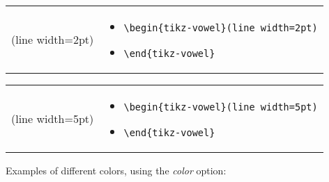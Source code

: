 \documentclass{article}
\begin{document}
\begin{center}
\begin{tabular}{rl}
  \begin{minipage}[t]{0.45\textwidth}
  \centering
	\begin{tikz-vowel}(line width=2pt)
	\end{tikz-vowel}
  \end{minipage} &
  \begin{minipage}[t]{0.2\textwidth}
  \vspace{-65pt}
  {\small
\begin{itemize}[label={}]
	\item \verb|\begin{tikz-vowel}(line width=2pt)|
	\item \verb|\end{tikz-vowel}|
\end{itemize}
    }
  \end{minipage}\\
\end{tabular}
\end{center}

\begin{center}
\begin{tabular}{rl}
  \begin{minipage}[t]{0.45\textwidth}
  \centering
	\begin{tikz-vowel}(line width=5pt)
	\end{tikz-vowel}
  \end{minipage} &
  \begin{minipage}[t]{0.2\textwidth}
  \vspace{-65pt}
  {\small
\begin{itemize}[label={}]
	\item \verb|\begin{tikz-vowel}(line width=5pt)|
	\item \verb|\end{tikz-vowel}|
\end{itemize}
    }
  \end{minipage}\\
\end{tabular}
\end{center}

\bigskip
\noindent
Examples of different colors, using the \textit{color} option:
\end{document}

